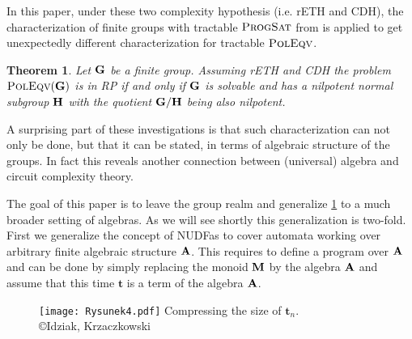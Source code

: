 \documentclass[11pt,a4paper]{amsart}
\newtheorem{thm}[lm]{Theorem}
\newcommand{\rptime}{\textsf{RP}\xspace}
\newcommand{\m}[1]{{\uppercase {\bf{#1}}}}
\newcommand{\po}[1]{{\mathbf {#1}}}
\newcommand{\gProblem}[2]{\ensuremath{\operatorname{\textup{\textsc{{#2}}}}
		\ifthenelse{\equal{#1}{}}{}{\!\left( {#1} \right)}}}
\newcommand{\poleqv}[1]{\gProblem{#1}{PolEqv}}
\newcommand{\progpolsat}[1]{\gProblem{#1}{ProgSat}}
\newcommand{\cdhh}{CDH\xspace}
\newcommand{\rethh}{rETH\xspace}
\begin{document}
In this paper, under these two complexity hypothesis (i.e. \rethh and \cdhh), the characterization of finite groups with tractable \progpolsat{} from \cite{IdziakKKW22-icalp} is applied  
to get unexpectedly different characterization for tractable \poleqv{}. 

\begin{thm}
\label{eqv-groups}
Let $\m G$ be a finite group.
Assuming \rethh and \cdhh
the problem \poleqv{\m G} is in \rptime if and only if $\m G$ is solvable and has a  nilpotent normal subgroup $\m H$ with the quotient $\m G/\m H$ being also nilpotent.
\end{thm}

A surprising part of these investigations is that such characterization can not only be done,
but that it can be stated, in terms of algebraic structure of the groups.
In fact this reveals another connection between (universal) algebra
and circuit complexity theory. 

The goal of this paper is to leave the group realm and generalize \cref{eqv-groups} 
to a much broader setting of algebras. As we will see shortly this generalization is two-fold.
First we generalize the concept of NUDFas to cover automata working over arbitrary finite algebraic structure $\m A$.
This requires to define a program over $\m A$ and can be done by simply replacing the monoid $\m M$ by the algebra $\m A$ and assume that this time $\po t$ is a term of the algebra $\m A$.

\begin{wrapfigure}{l}{0.39\textwidth}
\begin{center}
\texttt{[image: Rysunek4.pdf]}
{\small Compressing the size of $\po t_n$.}
\\{\small \copyright Idziak, Krzaczkowski \cite{IdziakK22}}
\label{fig:comm-circuit}
\end{center}

\end{wrapfigure}
\end{document}

